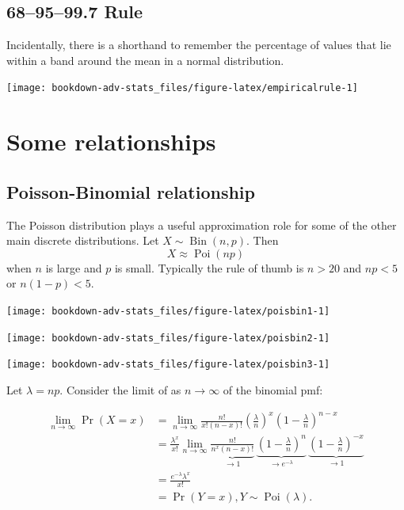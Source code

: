 \documentclass[
]{book}
\DeclareMathOperator{\Bin}{Bin}
\DeclareMathOperator{\Pois}{Poi}
\theoremstyle{definition}
\theoremstyle{definition}
\theoremstyle{definition}
\theoremstyle{definition}
\theoremstyle{remark}
\begin{document}
\hypertarget{rule}{%
\subsection{68--95--99.7 Rule}\label{rule}}

Incidentally, there is a shorthand to remember the percentage of values that lie within a band around the mean in a normal distribution.

\begin{center}\texttt{[image: bookdown-adv-stats\_files/figure-latex/empiricalrule-1]} \end{center}

\hypertarget{some-relationships}{%
\section{Some relationships}\label{some-relationships}}

\hypertarget{poisson-binomial-relationship}{%
\subsection{Poisson-Binomial relationship}\label{poisson-binomial-relationship}}

The Poisson distribution plays a useful approximation role for some of the other main discrete distributions.
Let \(X\sim\Bin(n,p)\).
Then
\[
X \approx \Pois(np)
\]
when \(n\) is large and \(p\) is small.
Typically the rule of thumb is \(n>20\) and \(np<5\) or \(n(1-p)<5\).

\begin{center}\texttt{[image: bookdown-adv-stats\_files/figure-latex/poisbin1-1]} \end{center}

\begin{center}\texttt{[image: bookdown-adv-stats\_files/figure-latex/poisbin2-1]} \end{center}

\begin{center}\texttt{[image: bookdown-adv-stats\_files/figure-latex/poisbin3-1]} \end{center}

Let \(\lambda=np\). Consider the limit of as \(n\to\infty\) of the binomial pmf:

\begin{align*}
\lim_{n\to\infty} \Pr(X=x) 
&= \lim_{n\to\infty} \frac{n!}{x!(n-x)!}\left(\frac{\lambda}{n} \right)^x \left(1 - \frac{\lambda}{n} \right)^{n-x} \\
&= \frac{\lambda^x}{x!} \lim_{n\to\infty} 
\underbrace{\frac{n!}{n^x(n-x)!}}_{\to 1}
\,
\underbrace{\left(1 - \frac{\lambda}{n} \right)^n}_{\to e^{-\lambda}}
\,
\underbrace{\left(1 - \frac{\lambda}{n} \right)^{-x}}_{\to 1} \\
&=  \frac{e^{-\lambda}\lambda^x}{x!} \\
&= \Pr(Y=x), Y\sim\Pois(\lambda).
\end{align*}
\end{document}
